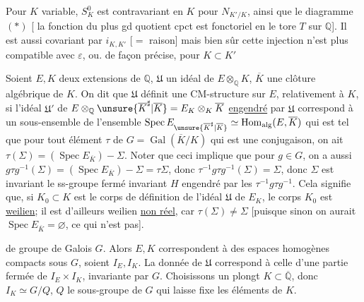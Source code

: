 Pour $K$ variable, $S_K^0$ est contravariant en $K$ pour $N_{K'/K}$,
ainsi que le diagramme $(*)$ [ la fonction du plus gd
quotient cpct est fonctoriel en le tore $T$ sur $\mathbb Q$].
Il est aussi covariant \deleted{\unsure{-}} par $i_{K,K'}$ [$=$ raison]
mais bien sûr cette injection n'est plus compatible avec $\varepsilon$,
ou. de façon précise, pour $K\subset K'$

Soient $E,K$ deux extensions de $\mathbb Q$, \deleted{$\Sigma$}
$\mathfrak U$ un idéal de  $E\otimes_{\mathbb Q}K$,
$\overline K$ une clôture algébrique de $K$.
On dit que $\mathfrak U$ définit une CM-structure sur $E$, relativement à $K$,
si l'idéal $\mathfrak U'$ de
$E\otimes_{\mathbb Q}\unsure{\overline K^{\sharp}|\overline K}=E_K\otimes_K\overline K$
\uline{engendré} par $\mathfrak U$ correspond à un sous-ensemble \inserted{$\Sigma$}
de l'ensemble  
$\operatorname{Spec}E_{\unsure{\overline K^{\sharp}|\overline K}}
\simeq\operatorname{Hom}_{\mathrm{alg}}(E,\overline K)$ qui est tel que pour tout
élément $\tau$ de $G=\operatorname{Gal}(\overline K/K)$ qui est une conjugaison,
on ait $\tau(\Sigma)=(\operatorname{Spec}E_{\overline K})-\Sigma$.
Noter que ceci implique que pour $g\in G$, on a aussi
$g\tau g^{-1}(\Sigma)=(\operatorname{Spec}E_{\overline K})-\Sigma=\tau\Sigma$,
donc $\tau^{-1}g\tau g^{-1}(\Sigma)=\Sigma$, donc $\Sigma$ est invariant
  le ss-groupe  fermé invariant $H$
engendré par les $\tau^{-1}g\tau g^{-1}$.
Cela signifie que, si $K_0\subset K$ est le corps de définition de l'idéal
$\mathfrak U$ de $E_K$, le corps $K_0$  est \uline{weilien};
 il est d'ailleurs weilien \uline{non réel}, car $\tau(\Sigma)\ne\Sigma$
[puisque sinon on aurait $\operatorname{Spec}E_{\overline K}=\varnothing$, ce qui n'est pas].

 de groupe de Galois $G$.
Alors $E,K$ correspondent à des espaces homogènes compacts sous $G$, soient $I_E,I_K$.
La donnée de $\mathfrak U$ correspond à celle d'une partie fermée de $I_E\times I_K$,
invariante par $G$. Choisissons un plongt $K\subset\overline{\mathbb Q}$,
donc $I_K\simeq G/Q$, $Q$ le sous-groupe de $G$ qui laisse fixe les éléments de $K$.


